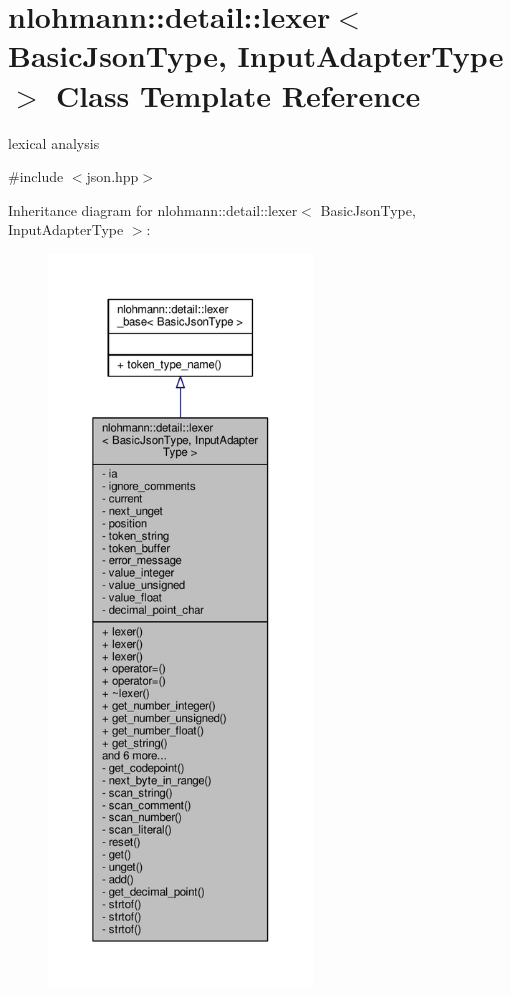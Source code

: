 \hypertarget{classnlohmann_1_1detail_1_1lexer}{}\section{nlohmann\+:\+:detail\+:\+:lexer$<$ Basic\+Json\+Type, Input\+Adapter\+Type $>$ Class Template Reference}
\label{classnlohmann_1_1detail_1_1lexer}


lexical analysis  




{\ttfamily \#include $<$json.\+hpp$>$}



Inheritance diagram for nlohmann\+:\+:detail\+:\+:lexer$<$ Basic\+Json\+Type, Input\+Adapter\+Type $>$\+:
\nopagebreak
\begin{figure}[H]
\begin{center}
\leavevmode
\includegraphics[height=550pt]{classnlohmann_1_1detail_1_1lexer__inherit__graph}
\end{center}
\end{figure}



